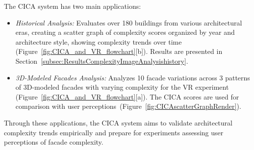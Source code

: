 The CICA system has two main applications:
\begin{itemize}
    \item \textit{Historical Analysis:} Evaluates over 180 buildings from various architectural eras, creating a scatter graph of complexity scores organized by year and architecture style, showing complexity trends over time (Figure~\ref{fig:CICA_and_VR_flowchart}[b]). Results are presented in Section~\ref{subsec:ResultsComplexityImageAnalysishistory}. 

    \item \textit{3D-Modeled Facades Analysis:} Analyzes 10 facade variations across 3 patterns of 3D-modeled facades with varying complexity for the VR experiment (Figure~\ref{fig:CICA_and_VR_flowchart}[a]). The CICA scores are used for comparison with user perceptions~(Figure~\ref{fig:CICAscatterGraphRender}).
\end{itemize}

Through these applications, the CICA system aims to validate architectural complexity trends empirically and prepare for experiments assessing user perceptions of facade complexity.
